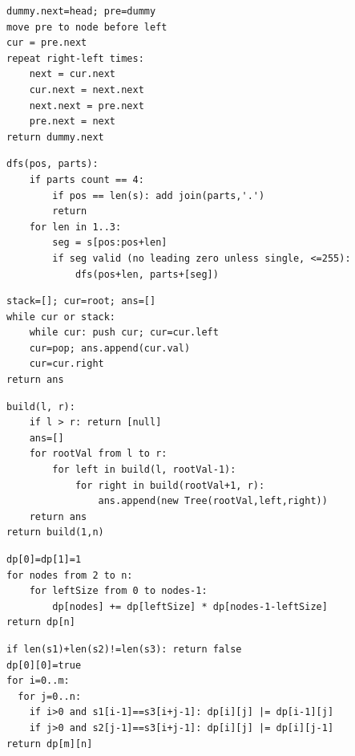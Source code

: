 \documentclass[11pt,a4paper]{ctexart}
\begin{document}
\begin{verbatim}
dummy.next=head; pre=dummy
move pre to node before left
cur = pre.next
repeat right-left times:
    next = cur.next
    cur.next = next.next
    next.next = pre.next
    pre.next = next
return dummy.next
\end{verbatim}

\begin{verbatim}
dfs(pos, parts):
    if parts count == 4:
        if pos == len(s): add join(parts,'.')
        return
    for len in 1..3:
        seg = s[pos:pos+len]
        if seg valid (no leading zero unless single, <=255):
            dfs(pos+len, parts+[seg])
\end{verbatim}

\begin{verbatim}
stack=[]; cur=root; ans=[]
while cur or stack:
    while cur: push cur; cur=cur.left
    cur=pop; ans.append(cur.val)
    cur=cur.right
return ans
\end{verbatim}

\begin{verbatim}
build(l, r):
    if l > r: return [null]
    ans=[]
    for rootVal from l to r:
        for left in build(l, rootVal-1):
            for right in build(rootVal+1, r):
                ans.append(new Tree(rootVal,left,right))
    return ans
return build(1,n)
\end{verbatim}

\begin{verbatim}
dp[0]=dp[1]=1
for nodes from 2 to n:
    for leftSize from 0 to nodes-1:
        dp[nodes] += dp[leftSize] * dp[nodes-1-leftSize]
return dp[n]
\end{verbatim}

\begin{verbatim}
if len(s1)+len(s2)!=len(s3): return false
dp[0][0]=true
for i=0..m:
  for j=0..n:
    if i>0 and s1[i-1]==s3[i+j-1]: dp[i][j] |= dp[i-1][j]
    if j>0 and s2[j-1]==s3[i+j-1]: dp[i][j] |= dp[i][j-1]
return dp[m][n]
\end{verbatim}
\end{document}
